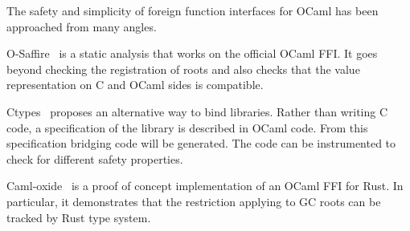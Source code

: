 \documentclass[a4paper]{easychair}
\newcommand{\cpp}[1]{\lstinline[style=C++]{#1}}
\begin{document}
The safety and simplicity of foreign function interfaces for OCaml has been
approached from many angles.

O-Saffire~\citep{Furr:2005:CTS:1064978.1065019} is a static analysis that works
on the official OCaml FFI. It goes beyond checking the registration of roots
and also checks that the value representation on C and OCaml sides is
compatible.

Ctypes~\citep{DBLP:journals/scp/YallopSM18} proposes an alternative way to bind
libraries. Rather than writing C code, a specification of the library is
described in OCaml code. From this specification bridging code will be
generated. The code can be instrumented to check for different safety
properties.

Caml-oxide~\citep{camloxide} is a proof of concept implementation of an OCaml
FFI for Rust. In particular, it demonstrates that the restriction applying to
GC roots can be tracked by Rust type system.

% 
% 

\label{sect:bib}

\end{document}
